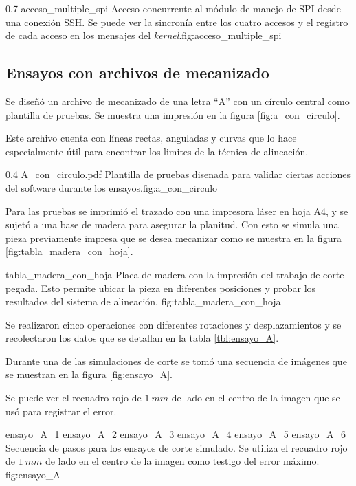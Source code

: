\subfiga
{0.7} {acceso_multiple_spi} {Acceso concurrente al módulo de manejo de SPI desde una conexión SSH. Se puede ver la sincronía entre los cuatro accesos y el registro de cada acceso en los mensajes del \textit{kernel}.}{fig:acceso_multiple_spi}


\subsection{Ensayos con archivos de mecanizado}

Se diseñó un archivo de mecanizado de una letra ``A'' con un círculo central como plantilla de pruebas. Se muestra una impresión en la figura \ref{fig:a_con_circulo}.\par

Este archivo cuenta con líneas rectas, anguladas y curvas que lo hace especialmente útil para encontrar los limites de la técnica de alineación. \par
\subfiga
{0.4} {A_con_circulo.pdf} {Plantilla de pruebas disenada para validar ciertas acciones del software durante los ensayos.}{fig:a_con_circulo}

Para las pruebas se imprimió el trazado con una impresora láser en hoja A4, y se sujetó a una base de madera para asegurar la planitud. Con esto se simula una pieza previamente impresa que se desea mecanizar como se muestra en la figura \ref{fig:tabla_madera_con_hoja}.\par

    {tabla_madera_con_hoja} {Placa de madera con la impresión del trabajo de corte pegada. Esto permite ubicar la pieza en diferentes posiciones y probar los resultados del sistema de alineación.} {fig:tabla_madera_con_hoja}

   Se realizaron cinco operaciones con diferentes rotaciones y desplazamientos y se recolectaron los datos que se detallan en la tabla \ref{tbl:ensayo_A}.\par
   Durante una de las simulaciones de corte se tomó una secuencia de imágenes que se muestran en la figura \ref{fig:ensayo_A}.\par
   Se puede ver el recuadro rojo de $1\:mm$ de lado en el centro de la imagen que se usó para registrar el error.\par

   \subfigthreethree
      {ensayo_A_1}
      {ensayo_A_2}
      {ensayo_A_3}
      {ensayo_A_4}
      {ensayo_A_5}
      {ensayo_A_6}
      {Secuencia de pasos para los ensayos de corte simulado. Se utiliza el recuadro rojo de $1\:mm$ de lado en el centro de la imagen como testigo del error máximo.}
      {fig:ensayo_A}

